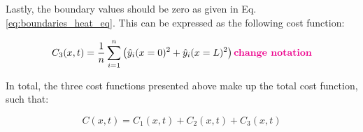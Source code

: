 Lastly, the boundary values should be zero as given in Eq. \ref{eq:boundaries_heat_eq}. 
This can be expressed as the following cost function: 

\begin{equation}
    C_3(x,t) = \frac{1}{n}\sum_{i=1}^{n}\left( \hat{y}_i(x = 0)^2+\hat{y}_i(x = L)^2\right)\textbf{\color{magenta}{change notation}}
\end{equation}

In total, the three cost functions presented above make up the total cost function, such that:

\begin{equation}
    C(x,t) = C_1(x,t) + C_2(x,t) + C_3(x,t)
\end{equation}

